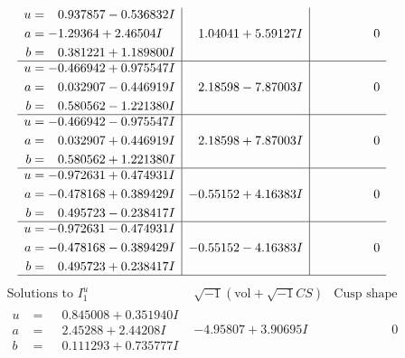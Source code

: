 \documentclass[1p]{elsarticle_modified}
\theoremstyle{definition}
\newcommand{\I}{\sqrt{-1}}
\begin{document}
$$\begin{array}{c|c|c}
\begin{aligned}
u &= \phantom{-}0.937857 - 0.536832 I \\
a &= -1.29364 + 2.46504 I \\
b &= \phantom{-}0.381221 + 1.189800 I\end{aligned}
 & \phantom{-}1.04041 + 5.59127 I & \phantom{-0.000000 } 0 \\ \hline\begin{aligned}
u &= -0.466942 + 0.975547 I \\
a &= \phantom{-}0.032907 - 0.446919 I \\
b &= \phantom{-}0.580562 - 1.221380 I\end{aligned}
 & \phantom{-}2.18598 - 7.87003 I & \phantom{-0.000000 } 0 \\ \hline\begin{aligned}
u &= -0.466942 - 0.975547 I \\
a &= \phantom{-}0.032907 + 0.446919 I \\
b &= \phantom{-}0.580562 + 1.221380 I\end{aligned}
 & \phantom{-}2.18598 + 7.87003 I & \phantom{-0.000000 } 0 \\ \hline\begin{aligned}
u &= -0.972631 + 0.474931 I \\
a &= -0.478168 + 0.389429 I \\
b &= \phantom{-}0.495723 - 0.238417 I\end{aligned}
 & -0.55152 + 4.16383 I & \phantom{-0.000000 } 0 \\ \hline\begin{aligned}
u &= -0.972631 - 0.474931 I \\
a &= -0.478168 - 0.389429 I \\
b &= \phantom{-}0.495723 + 0.238417 I\end{aligned}
 & -0.55152 - 4.16383 I & \phantom{-0.000000 } 0\\
 \hline 
 \end{array}$$\newpage$$\begin{array}{c|c|c}  
\text{Solutions to }I^u_{1}& \I (\text{vol} + \sqrt{-1}CS) & \text{Cusp shape}\\
 \hline 
\begin{aligned}
u &= \phantom{-}0.845008 + 0.351940 I \\
a &= \phantom{-}2.45288 + 2.44208 I \\
b &= \phantom{-}0.111293 + 0.735777 I\end{aligned}
 & -4.95807 + 3.90695 I & \phantom{-0.000000 } 0 \\ \hline\begin{aligned}

\end{aligned}
\end{array}$$
\end{document}
